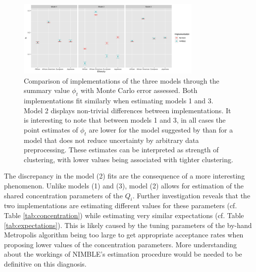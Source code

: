 \documentclass{article}
\begin{document}
\begin{figure}[h]
	\centering \includegraphics[width=0.8\textwidth]{SemesterProject/model_comp.png}
	\caption{Comparison of implementations of the three models through the summary value $\phi_t$ with Monte Carlo error assessed. Both implementations fit similarly when estimating models 1 and 3. Model 2 displays non-trivial differences between implementations. It is interesting to note that between models 1 and 3, in all cases the point estimates of $\phi_t$ are lower for the model suggested by \citeauthor{efron2016CASI} than for a model that does not reduce uncertainty by arbitrary data preprocessing. These estimates can be interpreted as strength of clustering, with lower values being associated with tighter clustering.}
	\label{fig:model_comp}
\end{figure} 

The discrepancy in the model (2) fits are the consequence of a more interesting phenomenon. Unlike models (1) and (3), model (2) allows for estimation of the shared concentration parameters of the $Q_i$. Further investigation reveals that the two implementations are estimating different values for these parameters (cf. Table \ref{tab:concentration}) while estimating very similar expectations (cf. Table \ref{tab:expectations}). This is likely caused by the tuning parameters of the by-hand Metropolis algorithm being too large to get appropriate acceptance rates when proposing lower values of the concentration parameters. More understanding about the workings of NIMBLE's estimation procedure would be needed to be definitive on this diagnosis.
\end{document}
